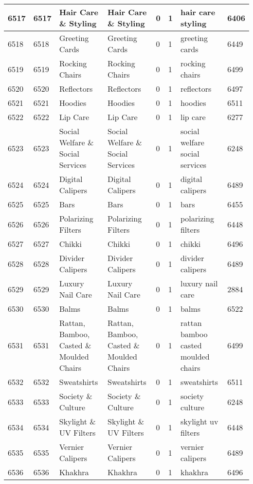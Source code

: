 \begin{longtable}{|l|l|l|l|l|l|l|l|}
6517 & 6517 & Hair Care \& Styling & Hair Care \& Styling & 0 & 1 & hair care styling & 6406 \\ \hline 
6518 & 6518 & Greeting Cards & Greeting Cards & 0 & 1 & greeting cards & 6449 \\ \hline 
6519 & 6519 & Rocking Chairs & Rocking Chairs & 0 & 1 & rocking chairs & 6499 \\ \hline 
6520 & 6520 & Reflectors & Reflectors & 0 & 1 & reflectors & 6497 \\ \hline 
6521 & 6521 & Hoodies & Hoodies & 0 & 1 & hoodies & 6511 \\ \hline 
6522 & 6522 & Lip Care & Lip Care & 0 & 1 & lip care & 6277 \\ \hline 
6523 & 6523 & Social Welfare \& Social Services & Social Welfare \& Social Services & 0 & 1 & social welfare social services & 6248 \\ \hline 
6524 & 6524 & Digital Calipers & Digital Calipers & 0 & 1 & digital calipers & 6489 \\ \hline 
6525 & 6525 & Bars & Bars & 0 & 1 & bars & 6455 \\ \hline 
6526 & 6526 & Polarizing Filters & Polarizing Filters & 0 & 1 & polarizing filters & 6448 \\ \hline 
6527 & 6527 & Chikki & Chikki & 0 & 1 & chikki & 6496 \\ \hline 
6528 & 6528 & Divider Calipers & Divider Calipers & 0 & 1 & divider calipers & 6489 \\ \hline 
6529 & 6529 & Luxury Nail Care & Luxury Nail Care & 0 & 1 & luxury nail care & 2884 \\ \hline 
6530 & 6530 & Balms & Balms & 0 & 1 & balms & 6522 \\ \hline 
6531 & 6531 & Rattan, Bamboo, Casted \& Moulded Chairs & Rattan, Bamboo, Casted \& Moulded Chairs & 0 & 1 & rattan bamboo casted moulded chairs & 6499 \\ \hline 
6532 & 6532 & Sweatshirts & Sweatshirts & 0 & 1 & sweatshirts & 6511 \\ \hline 
6533 & 6533 & Society \& Culture & Society \& Culture & 0 & 1 & society culture & 6248 \\ \hline 
6534 & 6534 & Skylight \& UV Filters & Skylight \& UV Filters & 0 & 1 & skylight uv filters & 6448 \\ \hline 
6535 & 6535 & Vernier Calipers & Vernier Calipers & 0 & 1 & vernier calipers & 6489 \\ \hline 
6536 & 6536 & Khakhra & Khakhra & 0 & 1 & khakhra & 6496 \\ \hline 

\end{longtable}
